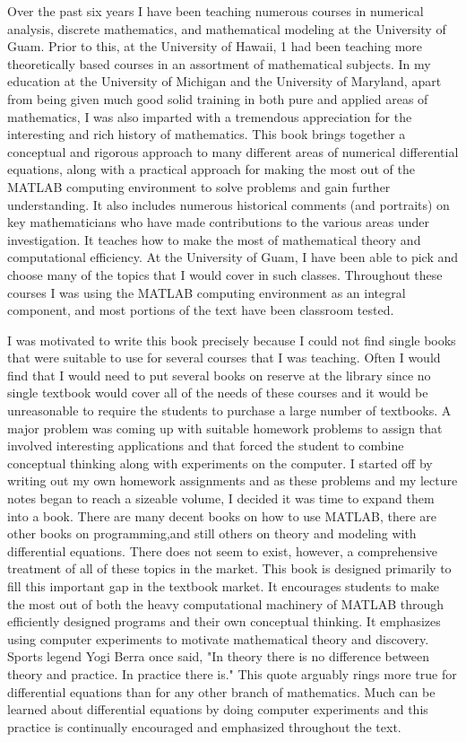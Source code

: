 \documentclass{book}
\begin{document}
Over the past six years I have been teaching numerous courses in numerical
analysis, discrete mathematics, and mathematical modeling at the University of
Guam. Prior to this, at the University of Hawaii, 1 had been teaching more
theoretically based courses in an assortment of mathematical subjects. In my
education at the University of Michigan and the University of Maryland, apart
from being given much good solid training in both pure and applied areas of
mathematics, I was also imparted with a tremendous appreciation for the
interesting and rich history of mathematics. This book brings together a
conceptual and rigorous approach to many different areas of numerical differential
equations, along with a practical approach for making the most out of the
MATLAB computing environment to solve problems and gain further
understanding. It also includes numerous historical comments (and portraits) on
key mathematicians who have made contributions to the various areas under
investigation. It teaches how to make the most of mathematical theory and
computational efficiency. At the University of Guam, I have been able to pick and
choose many of the topics that I would cover in such classes. Throughout these
courses I was using the MATLAB computing environment as an integral
component, and most portions of the text have been classroom tested.

I was motivated to write this book precisely because I could not find single books
that were suitable to use for several courses that I was teaching. Often I would
find that I would need to put several books on reserve at the library since no single
textbook would cover all of the needs of these courses and it would be
unreasonable to require the students to purchase a large number of textbooks. A
major problem was coming up with suitable homework problems to assign that
involved interesting applications and that forced the student to combine conceptual
thinking along with experiments on the computer. I started off by writing out my
own homework assignments and as these problems and my lecture notes began to
reach a sizeable volume, I decided it was time to expand them into a book. There
are many decent books on how to use MATLAB, there are other books on
programming,and still others on theory and modeling with differential equations.
There does not seem to exist, however, a comprehensive treatment of all of these
topics in the market. This book is designed primarily to fill this important gap in
the textbook market. It encourages students to make the most out of both the
heavy computational machinery of MATLAB through efficiently designed
programs and their own conceptual thinking. It emphasizes using computer
experiments to motivate mathematical theory and discovery. Sports legend Yogi
Berra once said, "In theory there is no difference between theory and practice. In
practice there is." This quote arguably rings more true for differential equations
than for any other branch of mathematics. Much can be learned about differential
equations by doing computer experiments and this practice is continually
encouraged and emphasized throughout the text.
\vspace{0.5cm}
\end{document}
